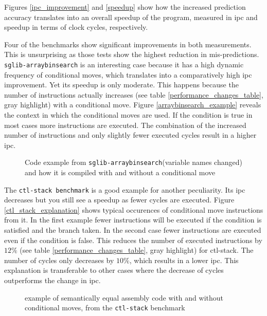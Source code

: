 \documentclass[12pt,twoside,notitlepage]{report}
\begin{document}
Figures \ref{ipc_improvement} and \ref{speedup} show how the increased prediction accuracy translates into an overall speedup of the program, measured in \gls{ipc} and speedup in terms of clock cycles, respectively.

Four of the benchmarks show significant improvements in both measurements. This is unsurprising as those tests show the highest reduction in mis-predictions. \texttt{sglib-arraybinsearch} is an interesting case because it has a high dynamic frequency of conditional moves, which translates into a comparatively high \gls{ipc} improvement. Yet its speedup is only moderate. This happens because the number of instructions actually increases (see table \ref{performance_changes_table}, gray highlight) with a conditional move. Figure \ref{arraybinsearch_example} reveals the context in which the conditional moves are used. If the condition is true in most cases more instructions are executed. The combination of the increased number of instructions and only slightly fewer executed cycles result in a higher \gls{ipc}.

\begin{figure}[htp]
\centering
\caption{Code example from \texttt{sglib-arraybinsearch}(variable names changed) and how it is compiled with and without a conditional move}
\end{figure}

The \texttt{ctl-stack benchmark} is a good example for another peculiarity. Its \gls{ipc} decreases but you still see a speedup as fewer cycles are executed. Figure \ref{ctl_stack_explanation} shows typical occurences of conditional move instructions from it. In the first example fewer instructions will be executed if the condition is satisfied and the branch taken. In the second case fewer instructions are executed even if the condition is false. This reduces the number of executed instructions by $12\%$ (see table \ref{performance_changes_table}, gray highlight) for ctl-stack. The number of cycles only decreases by $10\%$, which results in a lower \gls{ipc}. This explanation is transferable to other cases where the decrease of cycles outperforms the change in \gls{ipc}.

\begin{figure}[htp]
\centering
\caption{example of semantically equal assembly code with and without conditional moves, from the \texttt{ctl-stack} benchmark}
\end{figure}
\end{document}
